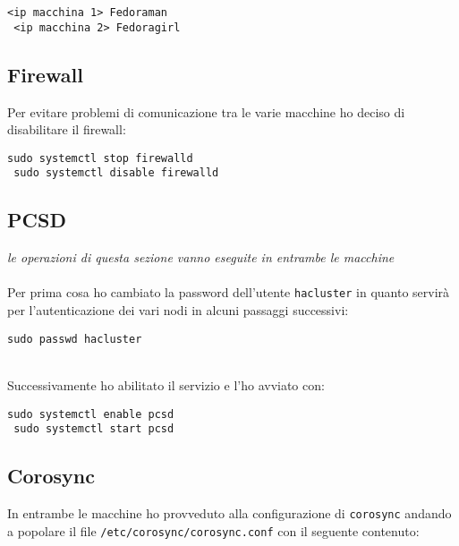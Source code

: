\begin{lstlisting}[style=cmd]
 <ip macchina 1> Fedoraman
 <ip macchina 2> Fedoragirl
\end{lstlisting}

\subsection{Firewall}

Per evitare problemi di comunicazione tra le varie macchine ho deciso di disabilitare il firewall:

\begin{lstlisting}[style=cmd]
 sudo systemctl stop firewalld
 sudo systemctl disable firewalld
\end{lstlisting}

\subsection{PCSD}
\label{sec:pcsd}
\textit{le operazioni di questa sezione vanno eseguite in entrambe le macchine }\\
\ \\
Per prima cosa ho cambiato la password dell'utente \lstinline[style=cmd]|hacluster| in quanto servir\`{a} per l'autenticazione dei vari nodi in alcuni passaggi successivi:

\begin{lstlisting}[style=cmd]
 sudo passwd hacluster
\end{lstlisting}
\ \\
Successivamente ho abilitato il servizio e l'ho avviato con:

\begin{lstlisting}[style=cmd]
 sudo systemctl enable pcsd
 sudo systemctl start pcsd
\end{lstlisting}

\subsection{Corosync}

In entrambe le macchine ho provveduto alla configurazione di \lstinline[style=cmd]|corosync| andando a popolare il file \lstinline[style=cmd]|/etc/corosync/corosync.conf| con il seguente contenuto:

